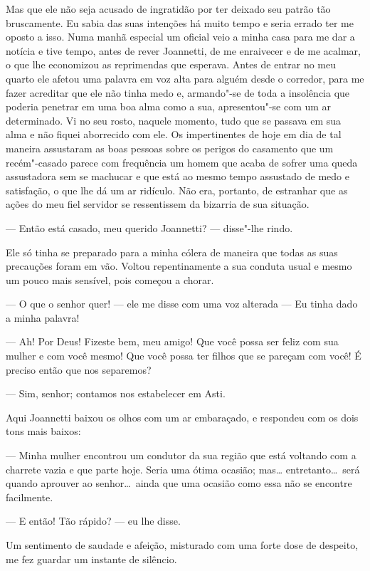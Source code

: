  Mas que ele não seja acusado de ingratidão por ter deixado seu patrão
tão bruscamente. Eu sabia das suas intenções há muito tempo e seria
errado ter me oposto a isso. Numa manhã especial um oficial veio a
minha casa para me dar a notícia e tive tempo, antes de rever
Joannetti, de me enraivecer e de me acalmar, o que lhe economizou as
reprimendas que esperava. Antes de entrar no meu quarto ele afetou uma
palavra em voz alta para alguém desde o corredor, para me fazer
acreditar que ele não tinha medo e, armando"-se de toda a insolência que
poderia penetrar em uma boa alma como a sua, apresentou"-se com um ar
determinado. Vi no seu rosto, naquele momento, tudo que se passava em
sua alma e não fiquei aborrecido com ele. Os impertinentes de hoje em
dia de tal maneira assustaram as boas pessoas sobre os perigos do
casamento que um recém"-casado parece com frequência um homem que acaba
de sofrer uma queda assustadora sem se machucar e que está ao mesmo
tempo assustado de medo e satisfação, o que lhe dá um ar ridículo. Não
era, portanto, de estranhar que as ações do meu fiel servidor se
ressentissem da bizarria de sua situação. 

 --- Então está casado, meu querido Joannetti? --- disse"-lhe rindo.

 Ele só tinha se preparado para a minha cólera de maneira que todas as
suas precauções foram em vão. Voltou repentinamente a sua conduta usual
e mesmo um pouco mais sensível, pois começou a chorar. 

 --- O que o senhor quer! --- ele me disse com uma voz alterada --- Eu
tinha dado a minha palavra!

 --- Ah! Por Deus! Fizeste bem, meu amigo! Que você possa ser feliz com sua
mulher e com você mesmo! Que você possa ter filhos que se pareçam com você! É
preciso então que nos separemos? 

 --- Sim, senhor; contamos nos estabelecer em Asti.

 Aqui Joannetti baixou os olhos com um ar embaraçado, e respondeu com os
dois tons mais baixos:

 --- Minha mulher encontrou um condutor da sua região que está voltando
com a charrete vazia e que parte hoje. Seria uma ótima ocasião; mas\ldots
entretanto\ldots\ será quando aprouver ao senhor\ldots\ ainda que uma ocasião
como essa não se encontre facilmente.

 --- E então! Tão rápido? --- eu lhe disse. 

Um sentimento de saudade e afeição, misturado com uma forte dose de
despeito, me fez guardar um instante de silêncio. 

